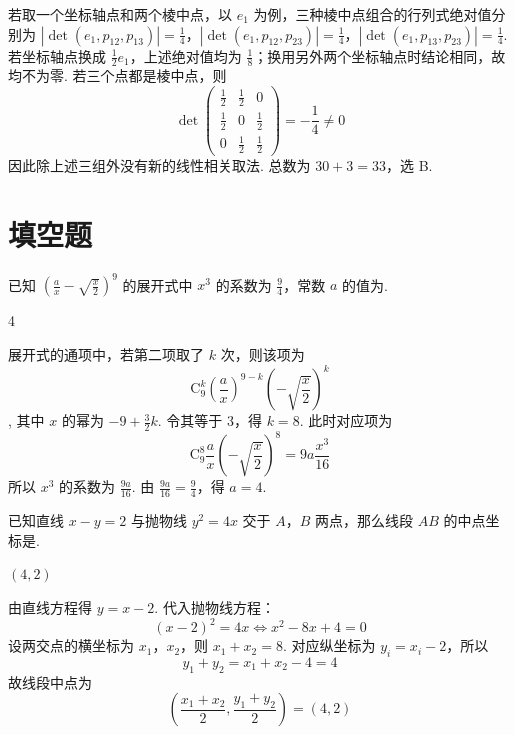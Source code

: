 \begin{solution}
若取一个坐标轴点和两个棱中点，以 \(e_1\) 为例，三种棱中点组合的行列式绝对值分别为 \(\left|\det(e_1,p_{12},p_{13})\right|=\frac14\)，\(\left|\det(e_1,p_{12},p_{23})\right|=\frac14\)，\(\left|\det(e_1,p_{13},p_{23})\right|=\frac14\).
若坐标轴点换成 \(\frac12e_1\)，上述绝对值均为 \(\frac18\)；换用另外两个坐标轴点时结论相同，故均不为零. 若三个点都是棱中点，则
\[
\det\begin{pmatrix}\frac12&\frac12&0\\\frac12&0&\frac12\\0&\frac12&\frac12\end{pmatrix}=-\frac14\ne0
\]
因此除上述三组外没有新的线性相关取法. 总数为 \(30+3=33\)，选 B.
\end{solution}

\section{填空题}

\begin{problem}
已知 \(\left(\frac{a}{x} - \sqrt{\frac{x}{2}}\right)^9\) 的展开式中 \(x^3\) 的系数为 \(\frac{9}{4}\)，常数 \(a\) 的值为\fillinblank{}.
\end{problem}

\begin{answer}
4
\end{answer}

\begin{solution}
展开式的通项中，若第二项取了 \(k\) 次，则该项为
\[
\mathrm C_9^k\left(\frac ax\right)^{9-k}
\left(-\sqrt{\frac x2}\right)^k
\],
其中 \(x\) 的幂为 \(-9+\frac32k\). 令其等于 \(3\)，得 \(k=8\). 此时对应项为
\[
\mathrm C_9^8\frac ax\left(-\sqrt{\frac x2}\right)^8
=9a\frac{x^3}{16}
\]
所以 \(x^3\) 的系数为 \(\frac{9a}{16}\). 由 \(\frac{9a}{16}=\frac94\)，得 \(a=4\).
\end{solution}

\begin{problem}
已知直线 \(x - y = 2\) 与抛物线 \(y^{2} = 4x\) 交于 \(A\)，\(B\) 两点，那么线段 \(AB\) 的中点坐标是\fillinblank{}.
\end{problem}

\begin{answer}
\((4,2)\)
\end{answer}

\begin{solution}
由直线方程得 \(y=x-2\). 代入抛物线方程：
\[
(x-2)^2=4x
\iff x^2-8x+4=0
\]
设两交点的横坐标为 \(x_1\)，\(x_2\)，则 \(x_1+x_2=8\). 对应纵坐标为 \(y_i=x_i-2\)，所以
\[
y_1+y_2=x_1+x_2-4=4
\]
故线段中点为
\[
\left(\frac{x_1+x_2}{2},\frac{y_1+y_2}{2}\right)=(4,2)
\]
\end{solution}

